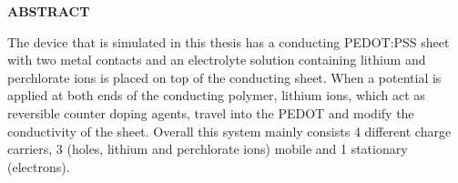 \documentclass[11pt, a4paper, oneside]{Thesis} %
\begin{document}
\large

\textbf{ABSTRACT}


\normalsize
\begin{center}
The device that is simulated in this thesis has a conducting PEDOT:PSS sheet with two metal contacts and an electrolyte solution containing lithium and perchlorate ions is placed on top of the conducting sheet. When a potential is applied at both ends of the conducting polymer, lithium ions, which act as reversible counter doping agents, travel into the PEDOT and modify the conductivity of the sheet. Overall this system mainly consists 4 different charge carriers, 3 (holes, lithium and perchlorate ions) mobile and 1 stationary (electrons).
\end{center}



\newpage %



\clearpage %


\pagestyle{fancy} %

\tableofcontents %

\listoffigures %

\listoftables %

\end{document}
